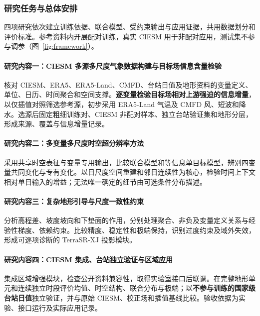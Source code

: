 \subsubsection{研究任务与总体安排}

四项研究依次建立训练依据、联合模型、受约束输出与应用证据，共用数据划分和评价标准。参考资料内开展配对训练，真实 CIESM 用于非配对应用，测试集不参与调参（图~\ref{fig:framework}）。

\paragraph{研究内容一：CIESM 多源多尺度气象数据构建与目标场信息含量检验}
核对 CIESM、ERA5、ERA5-Land、CMFD、台站日值及地形资料的变量定义、单位、日历、时间聚合和空间支撑。\textbf{逐变量检验目标场相对上游强迫的信息增量}，以仅插值对照筛选参考源，初步采用 ERA5-Land 气温及 CMFD 风、短波和降水。选源后固定粗细训练对、CIESM 非配对样本、独立台站验证集和地形分层，形成来源、覆盖与信息增量记录。

\paragraph{研究内容二：多变量多尺度时空超分辨率方法}
采用共享时空表征与变量专用输出，比较联合模型和等信息单目标模型，辨别四变量共同变化与专有变化。以日尺度空间重建和邻日连续性为核心，检验时间上下文相对单日输入的增益；无法唯一确定的细节由可选条件分布描述。

\paragraph{研究内容三：复杂地形引导与尺度一致性约束}
分析高程差、坡度坡向和下垫面的作用，分别处理聚合、非负及变量定义关系与经验性梯度、依赖约束。比较精度、稳定性和极端保持，识别过度约束及域外失效，形成可逐项诊断的 TerraSR-XJ 投影模块。

\paragraph{研究内容四：CIESM 集成、台站独立验证与区域应用}
集成区域增强模块，检查公开资料兼容性，取得实验室接口后联调。在完整地形单元和连续独立时段评价均值、时空结构、联合分布与极端；以\textbf{不参与训练的国家级台站日值}独立验证，并与原始 CIESM、校正场和插值基线比较。验收依据为实验、接口运行及实际应用记录。

